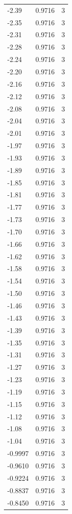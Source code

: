 \begin{longtable}{lrr}
  -2.39 & 0.9716 & 3 \\
  -2.35 & 0.9716 & 3 \\
  -2.31 & 0.9716 & 3 \\
  -2.28 & 0.9716 & 3 \\
  -2.24 & 0.9716 & 3 \\
  -2.20 & 0.9716 & 3 \\
  -2.16 & 0.9716 & 3 \\
  -2.12 & 0.9716 & 3 \\
  -2.08 & 0.9716 & 3 \\
  -2.04 & 0.9716 & 3 \\
  -2.01 & 0.9716 & 3 \\
  -1.97 & 0.9716 & 3 \\
  -1.93 & 0.9716 & 3 \\
  -1.89 & 0.9716 & 3 \\
  -1.85 & 0.9716 & 3 \\
  -1.81 & 0.9716 & 3 \\
  -1.77 & 0.9716 & 3 \\
  -1.73 & 0.9716 & 3 \\
  -1.70 & 0.9716 & 3 \\
  -1.66 & 0.9716 & 3 \\
  -1.62 & 0.9716 & 3 \\
  -1.58 & 0.9716 & 3 \\
  -1.54 & 0.9716 & 3 \\
  -1.50 & 0.9716 & 3 \\
  -1.46 & 0.9716 & 3 \\
  -1.43 & 0.9716 & 3 \\
  -1.39 & 0.9716 & 3 \\
  -1.35 & 0.9716 & 3 \\
  -1.31 & 0.9716 & 3 \\
  -1.27 & 0.9716 & 3 \\
  -1.23 & 0.9716 & 3 \\
  -1.19 & 0.9716 & 3 \\
  -1.15 & 0.9716 & 3 \\
  -1.12 & 0.9716 & 3 \\
  -1.08 & 0.9716 & 3 \\
  -1.04 & 0.9716 & 3 \\
  -0.9997 & 0.9716 & 3 \\
  -0.9610 & 0.9716 & 3 \\
  -0.9224 & 0.9716 & 3 \\
  -0.8837 & 0.9716 & 3 \\
  -0.8450 & 0.9716 & 3 \\

\end{longtable}
